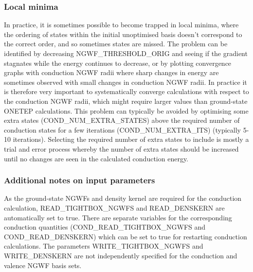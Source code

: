 \documentclass[letterpaper,10pt,english]{sphinxmanual}
\begin{document}
\subsubsection{Local minima}
\label{\detokenize{conduction:local-minima}}
In practice, it is sometimes possible to become trapped in local minima,
where the ordering of states within the initial unoptimised basis
doesn’t correspond to the correct order, and so sometimes states are
missed. The problem can be identified by decreasing
NGWF\_THRESHOLD\_ORIG and seeing if the gradient stagnates while the
energy continues to decrease, or by plotting convergence graphs with
conduction NGWF radii where sharp changes in energy are sometimes
observed with small changes in conduction NGWF radii. In practice it is
therefore very important to systematically converge calculations with
respect to the conduction NGWF radii, which might require larger values
than ground-state ONETEP calculations. This problem can typically be
avoided by optimising some extra states (COND\_NUM\_EXTRA\_STATES) above
the required number of conduction states for a few iterations
(COND\_NUM\_EXTRA\_ITS) (typically 5-10 iterations). Selecting the
required number of extra states to include is mostly a trial and error
process whereby the number of extra states should be increased until no
changes are seen in the calculated conduction energy.


\subsubsection{Additional notes on input parameters}
\label{\detokenize{conduction:additional-notes-on-input-parameters}}
As the ground-state NGWFs and density kernel are required for the
conduction calculation, READ\_TIGHTBOX\_NGWFS and READ\_DENSKERN are
automatically set to true. There are separate variables for the
corresponding conduction quantities (COND\_READ\_TIGHTBOX\_NGWFS and
COND\_READ\_DENSKERN) which can be set to true for restarting conduction
calculations. The parameters WRITE\_TIGHTBOX\_NGWFS and WRITE\_DENSKERN
are not independently specified for the conduction and valence NGWF
basis sets.
\end{document}
